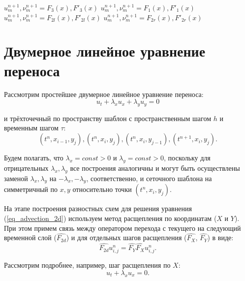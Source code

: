 \documentclass[11pt]{article}
\begin{document}
\begin{algorithm}
\begin{algorithmic}[1]

\fi

\Else
\State $u_m^{n+1}, \nu_m^{n+1} = F_3(x), F'_3(x)$
\EndIf
{}
\State $u_m^{n+1},  \nu_m^{n+1} = F_1(x), F'_1(x)$
\Else
{}
\State $u_m^{n+1}, \nu_m^{n+1} = F_{2l}(x), F'_{2l}(x)$
\Else
\State $u_m^{n+1}, \nu_m^{n+1} = F_{2r}(x), F'_{2r}(x)$
\EndIf
\EndIf
\end{algorithmic}
\end{algorithm}


\section{Двумерное линейное уравнение переноса}

Рассмотрим простейшее двумерное линейное уравнение переноса:
\begin{equation}
\label{eq_advection_2d}
u_t + \lambda_x u_x + \lambda_y u_y = 0
\end{equation}

и трёхточечный по пространству шаблон с пространственным шагом $h$ и временным шагом $\tau$:\begin{equation}
\label{eq_stencil_4}
(t^n, x_{i - 1}, y_j), (t^n, x_i, y_j), (t^n, x_i, y_{j - 1}), (t^{n + 1}, x_i, y_j).
\end{equation}

Будем полагать, что $\lambda_x = const > 0$ и $\lambda_y = const > 0$, поскольку для отрицательных $\lambda_x, \lambda_y$ все построения аналогичны и могут быть осуществлены заменой $\lambda_x, \lambda_y$ на $-\lambda_x, -\lambda_y$, соответственно, и сеточного шаблона на симметричный по $x, y$ относительно точки $(t^n, x_i, y_j)$.

На этапе построения разностных схем для решения уравнения (\ref{eq_advection_2d}) используем метод расщепления по координатам ($X$ и $Y$).
При этом примем связь между оператором перехода с текущего на следующий временной слой ($\hat{F_{2d}}$)
 и для отдельных шагов расщепления ($\hat{F_X}$, $\hat{F_Y}$) в виде:
\begin{equation}
\label{eq_operators}
\hat{F_{2d}} u^n_{i,j} = \hat{F_Y} \hat{F_X} u^n_{i,j}.
\end{equation}

Рассмотрим подробнее, например, шаг расщепления по $X$:
\begin{equation}
\label{eq_advection_x}
u_t + \lambda_x u_x = 0.
\end{equation}
\end{document}

